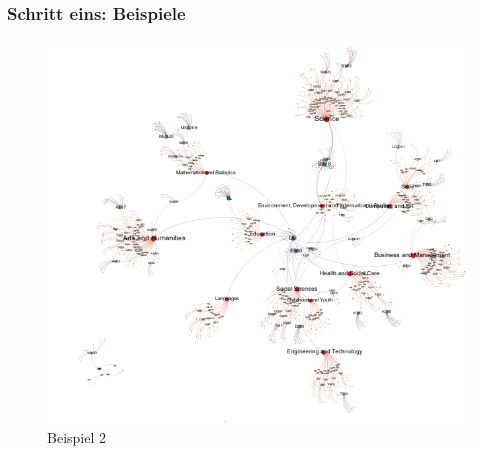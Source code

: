\begin{frame}

\frametitle{Schritt eins: Beispiele}
\label{schritteins:beispiele}

\begin{figure}[htbp]
\centering
\includegraphics[keepaspectratio,width=\textwidth,height=0.75\textheight]{s1_bsp2.png}
\caption{Beispiel 2}
\label{}
\end{figure}


\end{frame}

